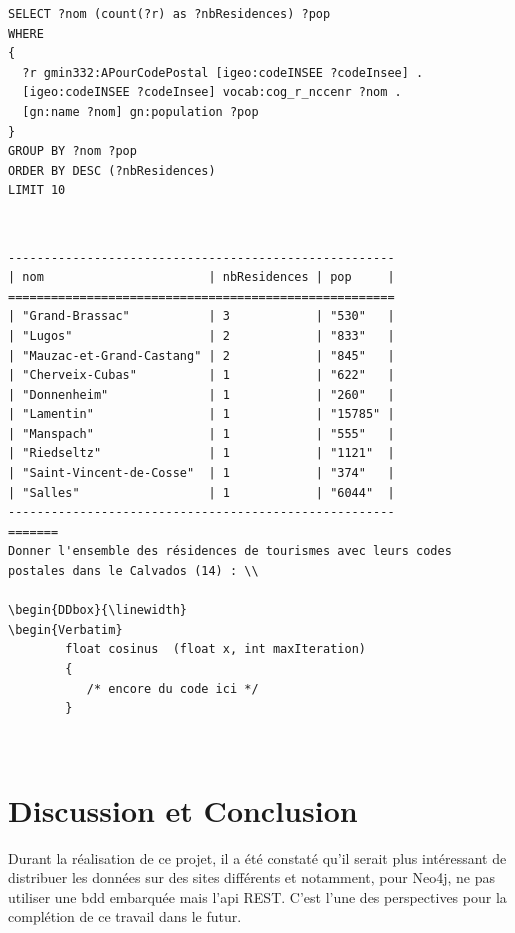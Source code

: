 \documentclass{article}
\newenvironment{DDbox}[1]{
	\begin{lrbox}{\BBbox}\begin{minipage}{\linewidth}}
		{\end{minipage}\end{lrbox}\noindent\colorbox{Zgris}{\usebox{\BBbox}} \\
		[.5cm]}
\begin{document}
\begin{DDbox}{\linewidth}
	\begin{Verbatim}
SELECT ?nom (count(?r) as ?nbResidences) ?pop
WHERE
{
  ?r gmin332:APourCodePostal [igeo:codeINSEE ?codeInsee] .
  [igeo:codeINSEE ?codeInsee] vocab:cog_r_nccenr ?nom .
  [gn:name ?nom] gn:population ?pop
}
GROUP BY ?nom ?pop
ORDER BY DESC (?nbResidences)
LIMIT 10
\end{Verbatim}
\end{DDbox}
\begin{DDbox}{\linewidth}
\begin{Verbatim}
------------------------------------------------------
| nom                       | nbResidences | pop     |
======================================================
| "Grand-Brassac"           | 3            | "530"   |
| "Lugos"                   | 2            | "833"   |
| "Mauzac-et-Grand-Castang" | 2            | "845"   |
| "Cherveix-Cubas"          | 1            | "622"   |
| "Donnenheim"              | 1            | "260"   |
| "Lamentin"                | 1            | "15785" |
| "Manspach"                | 1            | "555"   |
| "Riedseltz"               | 1            | "1121"  |
| "Saint-Vincent-de-Cosse"  | 1            | "374"   |
| "Salles"                  | 1            | "6044"  |
------------------------------------------------------
=======
Donner l'ensemble des résidences de tourismes avec leurs codes postales dans le Calvados (14) : \\

\begin{DDbox}{\linewidth}
\begin{Verbatim}
        float cosinus  (float x, int maxIteration)
        {
           /* encore du code ici */
        }

\end{Verbatim}
\end{DDbox}


\section{Discussion et Conclusion }
Durant la réalisation de ce projet, il a été constaté qu'il serait plus intéressant de distribuer les données sur des sites différents et notamment, pour Neo4j, ne pas utiliser une bdd embarquée mais l'api REST. C'est l'une des perspectives pour la complétion de ce travail dans le futur.\\
\end{document}
